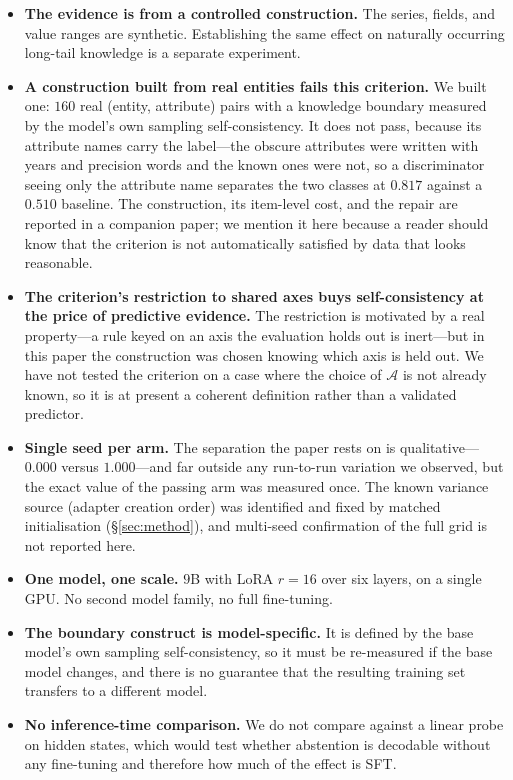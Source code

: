 \documentclass[11pt,a4paper]{article}
\begin{document}
\begin{itemize}[leftmargin=1.4em,itemsep=2pt]
\item \textbf{The evidence is from a controlled construction.} The series,
      fields, and value ranges are synthetic. Establishing the same effect on
      naturally occurring long-tail knowledge is a separate experiment.
\item \textbf{A construction built from real entities fails this criterion.}
      We built one: $160$ real (entity, attribute) pairs with a knowledge
      boundary measured by the model's own sampling self-consistency. It does
      not pass, because its attribute names carry the label---the obscure
      attributes were written with years and precision words and the known ones
      were not, so a discriminator seeing only the attribute name separates the
      two classes at $0.817$ against a $0.510$ baseline. The construction, its
      item-level cost, and the repair are reported in a companion paper; we
      mention it here because a reader should know that the criterion is not
      automatically satisfied by data that looks reasonable.
\item \textbf{The criterion's restriction to shared axes buys self-consistency
      at the price of predictive evidence.} The restriction is motivated by a
      real property---a rule keyed on an axis the evaluation holds out is
      inert---but in this paper the construction was chosen knowing which axis
      is held out. We have not tested the criterion on a case where the choice
      of $\mathcal A$ is not already known, so it is at present a coherent
      definition rather than a validated predictor.
\item \textbf{Single seed per arm.} The separation the paper rests on is
      qualitative---$0.000$ versus $1.000$---and far outside any run-to-run
      variation we observed, but the exact value of the passing arm was
      measured once. The known variance source (adapter creation order) was
      identified and fixed by matched initialisation (\S\ref{sec:method}), and
      multi-seed confirmation of the full grid is not reported here.
\item \textbf{One model, one scale.} $9$B with LoRA $r{=}16$ over six layers,
      on a single GPU. No second model family, no full fine-tuning.
\item \textbf{The boundary construct is model-specific.} It is defined by the
      base model's own sampling self-consistency, so it must be re-measured if
      the base model changes, and there is no guarantee that the resulting
      training set transfers to a different model.
\item \textbf{No inference-time comparison.} We do not compare against a linear
      probe on hidden states, which would test whether abstention is decodable
      without any fine-tuning and therefore how much of the effect is SFT.
\end{itemize}
\end{document}
